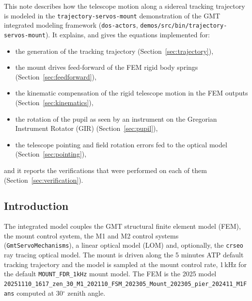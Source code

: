 \documentclass{gmto}
\numberwithin{table}{section}
\numberwithin{equation}{section}
\newcommand{\code}[1]{\texttt{#1}}
\begin{document}
This note describes how the telescope motion along a sidereal tracking trajectory is modeled in the
\code{trajectory-servos-mount} demonstration of the GMT integrated modeling framework
(\code{dos-actors}, \code{demos/src/bin/trajectory-servos-mount}).
It explains, and gives the equations implemented for:
\begin{itemize}
\item the generation of the tracking trajectory (Section~\ref{sec:trajectory}),
\item the mount drives feed-forward of the FEM rigid body springs (Section~\ref{sec:feedforward}),
\item the kinematic compensation of the rigid telescope motion in the FEM outputs (Section~\ref{sec:kinematics}),
\item the rotation of the pupil as seen by an instrument on the Gregorian Instrument Rotator (GIR)
  (Section~\ref{sec:pupil}),
\item the telescope pointing and field rotation errors fed to the optical model (Section~\ref{sec:pointing}),
\end{itemize}
and it reports the verifications that were performed on each of them (Section~\ref{sec:verification}).

\subsection{Introduction}
\label{sec:introduction}

The integrated model couples the GMT structural finite element model (FEM), the mount control
system, the M1 and M2 control systems (\code{GmtServoMechanisms}), a linear optical model (LOM) and,
optionally, the \code{crseo} ray tracing optical model.
The mount is driven along the 5 minutes ATP default tracking trajectory and the model is sampled
at the mount control rate, 1\,kHz for the default \code{MOUNT\_FDR\_1kHz} mount model.
The FEM is the 2025 model
\code{20251110\_1617\_zen\_30\_M1\_202110\_FSM\_202305\_}\linebreak\code{Mount\_202305\_pier\_202411\_M1Fans}
computed at 30$^\circ$ zenith angle.
\end{document}
